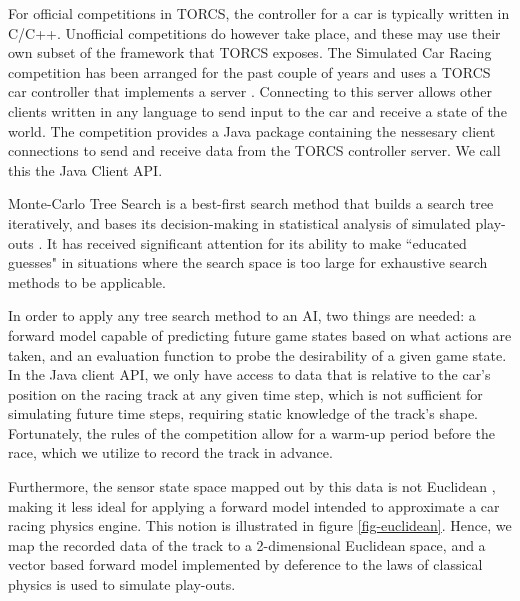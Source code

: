 \documentclass[conference]{IEEEtran}
\begin{document}
For official competitions in TORCS, the controller for a car is typically written in C/C++. Unofficial competitions do however take place, and these may use their own subset of the framework that TORCS exposes. The Simulated Car Racing competition has been arranged for the past couple of years and uses a TORCS car controller that implements a server \cite{manual}. Connecting to this server allows other clients written in any language to send input to the car and receive a state of the world. The competition provides a Java package containing the nessesary client connections to send and receive data from the TORCS controller server. We call this the Java Client API.

Monte-Carlo Tree Search is a best-first search method that builds a search tree iteratively, and bases its decision-making in statistical analysis of simulated play-outs \cite{browne}. It has received significant attention for its ability to make ``educated guesses" in situations where the search space is  too large for exhaustive search methods to be applicable.

In order to apply any tree search method to an AI, two things are needed: a forward model capable of predicting future game states based on what actions are taken, and an evaluation function to probe the desirability of a given game state. In the Java client API, we only have access to data that is relative to the car's position on the racing track at any given time step, which is not sufficient for simulating future time steps, requiring static knowledge of the track's shape. Fortunately, the rules of the competition \cite{manual} allow for a warm-up period before the race, which we utilize to record the track in advance.

Furthermore, the sensor state space mapped out by this data is not Euclidean \cite{euclidean}, making it less ideal for applying a forward model intended to approximate a car racing physics engine. This notion is illustrated in figure \ref{fig-euclidean}. Hence, we map the recorded data of the track to a 2-dimensional Euclidean space, and a vector based forward model implemented by deference to the laws of classical physics is used to simulate play-outs.
\end{document}
